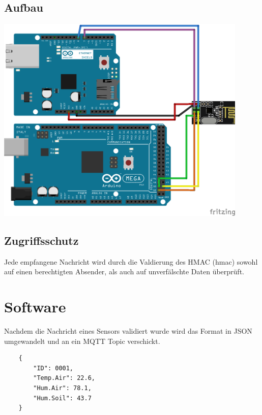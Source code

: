 \documentclass[
  12pt, %
  a4paper, %
  twoside, %
  openany, %
  numbers=noenddot, %
  BCOR=5mm, %
  parskip=half*, %
  thesis, %
]{bfhbook}
\begin{document}
\subsection{Aufbau}
\begin{center}
    \includegraphics[width=12cm, left]{Bilder/MQTT-Gateway-Design_Steckplatine.png}
\end{center}
\subsection{Zugriffsschutz}
Jede empfangene Nachricht wird durch die Valdierung des HMAC (\Gls{hmac}) sowohl auf einen berechtigten Absender, als auch auf unverfälschte Daten überprüft.
\section{Software}
Nachdem die Nachricht eines Sensors validiert wurde wird das Format in JSON umgewandelt und an ein MQTT Topic verschickt.
\begin{center}
	\begin{verbatim}
	{     
	    "ID": 0001, 
	    "Temp.Air": 22.6,
	    "Hum.Air": 78.1, 
	    "Hum.Soil": 43.7
	}
	\end{verbatim}
	\label{json-example}
\end{center}
\end{document}
